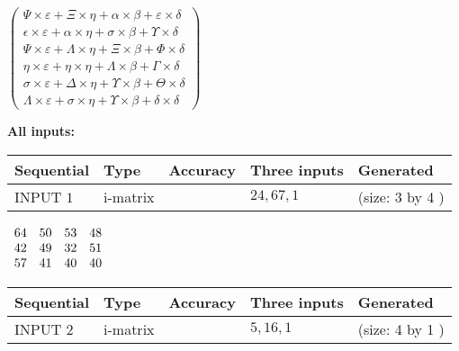 \documentclass[12pt]{article}
\begin{document}
   
 $  \left( \begin{array}
 {
 c
 }
  \Psi \times  \varepsilon +                     \Xi \times  \eta +  \alpha \times  \beta +  \varepsilon \times  \delta \\ 
  \epsilon \times  \varepsilon +  \alpha \times  \eta +  \sigma \times  \beta +  \Upsilon \times  \delta \\ 
  \Psi \times  \varepsilon +  \Lambda \times  \eta +                     \Xi \times  \beta +  \Phi \times  \delta \\ 
  \eta \times  \varepsilon +  \eta \times  \eta +  \Lambda \times  \beta +  \Gamma \times  \delta \\ 
  \sigma \times  \varepsilon +  \Delta \times  \eta +  \Upsilon \times  \beta +  \Theta \times  \delta \\ 
  \Lambda \times  \varepsilon +  \sigma \times  \eta +  \Upsilon \times  \beta +  \delta \times  \delta
 \end{array} \right) $ 
   
   
\noindent\vspace{0.1in}\hspace{-0.08in} {\textbf{\Large{All inputs: }}}
   
   
  
  
\noindent\begin{tabular}{|l|l|l|l|l|}
\hline
 Sequential & Type & Accuracy & Three inputs & Generated \\ 
\hline
 
 
  INPUT $            1 $ & i-matrix &  & $
 24
 , 
 67
 , 
 1
 $ & (size:            3  by            4 )
 \\  \hline  
 \end{tabular}
   
   
 $\begin{array}{
 c
 c
 c
 c
 }
          64  & 
          50  & 
          53  & 
          48  \\ 
          42  & 
          49  & 
          32  & 
          51  \\ 
          57  & 
          41  & 
          40  & 
          40
\end{array}  $ 
  
  
\noindent\begin{tabular}{|l|l|l|l|l|}
\hline
 Sequential & Type & Accuracy & Three inputs & Generated \\ 
\hline
 
 
  INPUT $            2 $ & i-matrix &  & $
 5
 , 
 16
 , 
 1
 $ & (size:            4  by            1 )
 \\  \hline  
 \end{tabular}
   
\end{document}
